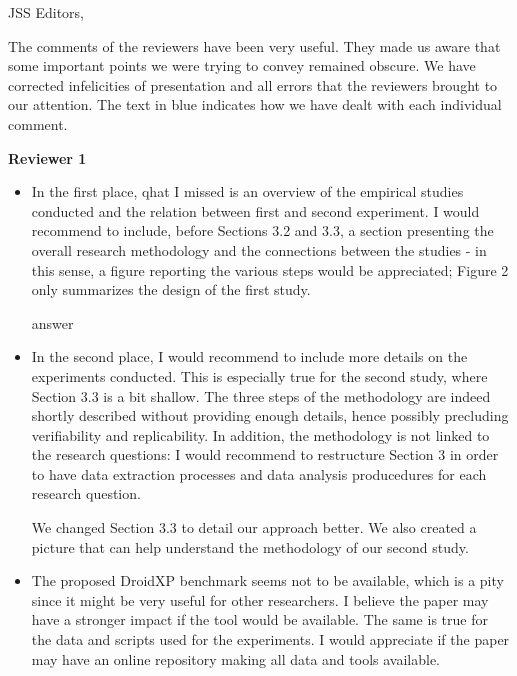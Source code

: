 \documentclass{letter}
\begin{document}
\begin{letter}{JSS Editors,}
\opening{The comments of the reviewers have been very useful. They made us aware that some important points we were trying to convey remained obscure. We have corrected infelicities of presentation and all errors that the reviewers brought to our attention. The text in {\color{blue}blue} indicates how we have dealt with each individual comment.}


{\bf Reviewer 1}

\begin{itemize}
\item In the first place, qhat I missed is an overview of the empirical studies conducted and the relation between 
first and second experiment. I would recommend to include, before Sections 3.2 and 3.3, a section 
presenting the overall research methodology and the connections between the studies - in this sense, 
a figure reporting the various steps would be appreciated; Figure 2 only summarizes the design of the first study.


\vspace{0.2cm}
  
{\color{blue}{\bf Answer:} answer}

\vspace{0.2cm}

\item In the second place, I would recommend to include more details on the experiments conducted. This is especially 
true for the second study, where Section 3.3 is a bit shallow. The three steps of the methodology are indeed shortly 
described without providing enough details, hence possibly precluding verifiability and replicability. In addition, the 
methodology is not linked to the research questions: I would recommend to restructure Section 3 in order to have 
data extraction processes and data analysis producedures for each research question.


\vspace{0.2cm}

{\color{blue}{\bf Answer:} We changed Section 3.3 to detail our approach better. We also created a picture that can help understand the methodology of our second study.}  

\vspace{0.2cm}

\item The proposed DroidXP benchmark seems not to be available, which is a pity since it might be very useful for other 
researchers. I believe the paper may have a stronger impact if the tool would be available. The same is true for the 
data and scripts used for the experiments. I would appreciate if the paper may have an online repository making all 
data and tools available.



\end{itemize}
\end{letter}
\end{document}
